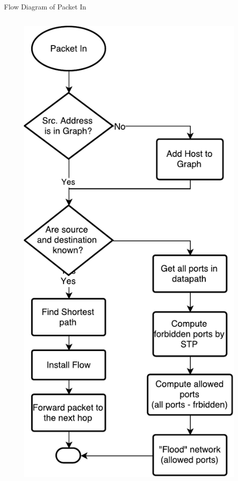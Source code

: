 \documentclass{beamer}
\begin{document}
\begin{frame}{Flow Diagram of Packet In}
  \begin{columns}
    \begin{column}{0.5\textwidth}
      \begin{figure}
	  \includegraphics[scale=0.27]{images/algorithm1.pdf}

\end{figure}
\end{column}
\end{columns}
\end{frame}
\end{document}
